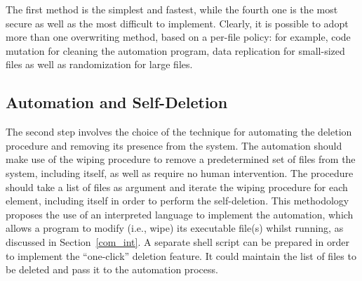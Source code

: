 \documentclass[conference]{IEEEtran}
\begin{document}
\vspace{0.15cm}
The first method is the simplest and fastest, while the fourth one is the most secure as well as the most difficult to implement. Clearly, it is possible to adopt more than one overwriting method, based on a per-file policy: for example, code mutation for cleaning the automation program, data replication for small-sized files as well as randomization for large files.

\subsection{Automation and Self-Deletion}
\label{overw}
The second step involves the choice of the technique for automating the deletion procedure and removing its presence from the system.
The automation should make use of the wiping procedure to remove a predetermined set of files from the system, including itself, as well as require no human intervention. The procedure should take a list of files as argument and iterate the wiping procedure for each element, including itself in order to perform the self-deletion. This methodology proposes the use of an interpreted language to implement the automation, which allows a program to modify (i.e., wipe) its executable file(s) whilst running, as discussed in Section~\ref{com_int}.
A separate shell script can be prepared in order to implement the ``one-click'' deletion feature.
It could maintain the list of files to be deleted and pass it to the automation process.

\end{document}
